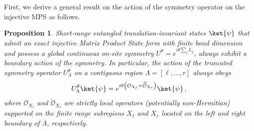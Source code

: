 \documentclass[prx,letterpaper,aps,superscriptaddress,floatfix,twocolumn,nofootinbib]{revtex4-2}
\newtheorem{prop}{Proposition}
\theoremstyle{definition}
\begin{document}
%
First, we derive a general result on the action of the symmetry operator on the injective MPS as follows.
\begin{prop}
\label{prop:symfrac}
%
    Short-range entangled translation-invariant states $\ket{\psi}$ that admit an exact injective Matrix Product State form with finite bond dimension and possess a global continuous on-site symmetry $U^\theta=e^{i\theta\sum_j L_j}$, always exhibit a boundary action of the symmetry.
    In particular, the action of the truncated symmetry operator $U_{\Lambda}^\theta$ on a contiguous region $\Lambda = [\ell,\dots,r]$ always obeys
    \begin{equation}
    U_{\Lambda}^\theta\ket{\psi}= e^{i\theta\left(\mathcal{O}_{X_\ell}+\mathcal{\widetilde{O}}_{X_r}\right)}\ket{\psi}\,,
    \label{eq:ULambdaboundary}
    \end{equation}
    where $\mathcal{O}_{X_\ell}$ and $\widetilde{\mathcal{O}}_{X_r}$ are strictly local operators (potentially non-Hermitian) supported on the finite range subregions $X_\ell$ and $X_r$ located on the left and right boundary of $\Lambda$, respectively.
\end{prop}
%
\end{document}

